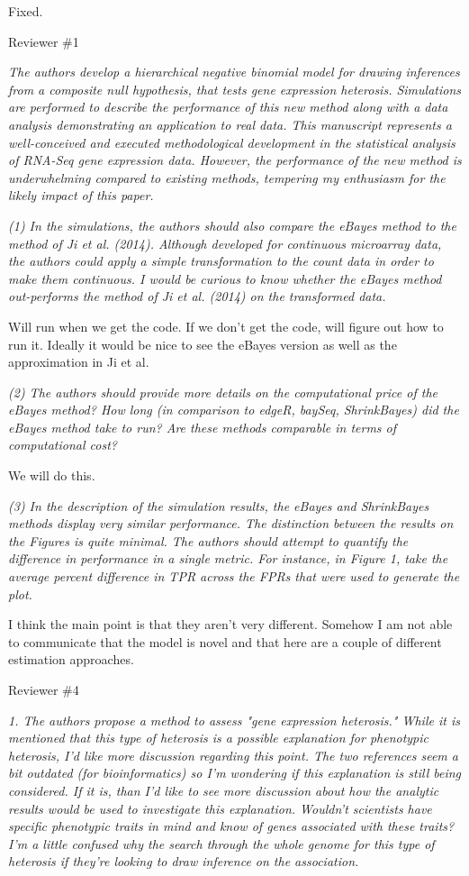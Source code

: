\documentclass{article}
\newcommand{\comment}[1]{\textit{#1}}
\newcommand{\response}[1]{#1}
\newcommand{\todo}[1]{{\color{red} #1}}
\begin{document}
\response{Fixed.}

Reviewer \#1

\comment{The authors develop a hierarchical negative binomial model for drawing inferences from a composite null hypothesis, that tests gene expression heterosis. Simulations are performed to describe the performance of this new method along with a data analysis demonstrating an application to real data. This manuscript represents a well-conceived and executed methodological development in the statistical analysis of RNA-Seq gene expression data. However, the performance of the new method is underwhelming compared to existing methods, tempering my enthusiasm for the likely impact of this paper.}

\comment{(1) In the simulations, the authors should also compare the eBayes method to the method of Ji et al. (2014). Although developed for continuous microarray data, the authors could apply a simple transformation to the count data in order to make them continuous. I would be curious to know whether the eBayes method out-performs the method of Ji et al. (2014) on the transformed data.}

\todo{Will run when we get the code. If we don't get the code, will figure out how to run it. Ideally it would be nice to see the eBayes version as well as the approximation in Ji et al.}

\comment{(2) The authors should provide more details on the computational price of the eBayes method? How long (in comparison to edgeR, baySeq, ShrinkBayes) did the eBayes method take to run? Are these methods comparable in terms of computational cost?}

\todo{We will do this.}

\comment{(3) In the description of the simulation results, the eBayes and ShrinkBayes methods display very similar performance. The distinction between the results on the Figures is quite minimal. The authors should attempt to quantify the difference in performance in a single metric. For instance, in Figure 1, take the average percent difference in TPR across the FPRs that were used to generate the plot.}

\todo{I think the main point is that they aren't very different. Somehow I am not able to communicate that the model is novel and that here are a couple of different estimation approaches.}

Reviewer \#4

\comment{1. The authors propose a method to assess "gene expression heterosis."   While it is mentioned that this type of heterosis is a possible explanation for phenotypic heterosis, I'd like more discussion regarding this point.  The two references seem a bit outdated (for bioinformatics) so I'm wondering if this explanation is still being considered.  If it is, than I'd like to see more discussion about how the analytic results would be used to investigate this explanation.   Wouldn't scientists have specific phenotypic traits in mind and know of genes associated with these traits?  I'm a little confused why the search through the whole genome for this type of heterosis if they're looking to draw inference on the association.}
\end{document}
